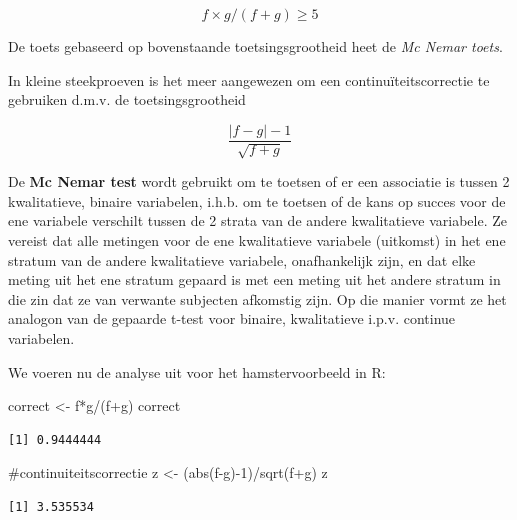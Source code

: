 \documentclass[
  dutch,
  letterpaper,
  12pt]{book}
\newenvironment{Shaded}{\begin{snugshade}}{\end{snugshade}}
\newcommand{\CommentTok}[1]{\textcolor[rgb]{0.37,0.37,0.37}{#1}}
\newcommand{\DecValTok}[1]{\textcolor[rgb]{0.68,0.00,0.00}{#1}}
\newcommand{\FunctionTok}[1]{\textcolor[rgb]{0.28,0.35,0.67}{#1}}
\newcommand{\NormalTok}[1]{\textcolor[rgb]{0.00,0.23,0.31}{#1}}
\newcommand{\OtherTok}[1]{\textcolor[rgb]{0.00,0.23,0.31}{#1}}
\newcommand{\SpecialCharTok}[1]{\textcolor[rgb]{0.37,0.37,0.37}{#1}}
\theoremstyle{definition}
\theoremstyle{definition}
\theoremstyle{definition}
\theoremstyle{remark}
\begin{document}
\[f \times g/(f+g) \geq 5\]

De toets gebaseerd op bovenstaande toetsingsgrootheid heet de \emph{Mc
Nemar toets}.

In kleine steekproeven is het meer aangewezen om een
continuïteitscorrectie te gebruiken d.m.v. de toetsingsgrootheid

\begin{equation*}
\frac{|f-g|-1}{\sqrt{f+g}}
\end{equation*}

De \textbf{Mc Nemar test} wordt gebruikt om te toetsen of er een
associatie is tussen 2 kwalitatieve, binaire variabelen, i.h.b. om te
toetsen of de kans op succes voor de ene variabele verschilt tussen de 2
strata van de andere kwalitatieve variabele. Ze vereist dat alle
metingen voor de ene kwalitatieve variabele (uitkomst) in het ene
stratum van de andere kwalitatieve variabele, onafhankelijk zijn, en dat
elke meting uit het ene stratum gepaard is met een meting uit het andere
stratum in die zin dat ze van verwante subjecten afkomstig zijn. Op die
manier vormt ze het analogon van de gepaarde t-test voor binaire,
kwalitatieve i.p.v. continue variabelen.

We voeren nu de analyse uit voor het hamstervoorbeeld in R:

\begin{Shaded}
\begin{Highlighting}[]
\NormalTok{correct }\OtherTok{\textless{}{-}}\NormalTok{ f}\SpecialCharTok{*}\NormalTok{g}\SpecialCharTok{/}\NormalTok{(f}\SpecialCharTok{+}\NormalTok{g)}
\NormalTok{correct}
\end{Highlighting}
\end{Shaded}

\begin{verbatim}
[1] 0.9444444
\end{verbatim}

\begin{Shaded}
\begin{Highlighting}[]
\CommentTok{\#continuiteitscorrectie}
\NormalTok{z }\OtherTok{\textless{}{-}}\NormalTok{ (}\FunctionTok{abs}\NormalTok{(f}\SpecialCharTok{{-}}\NormalTok{g)}\SpecialCharTok{{-}}\DecValTok{1}\NormalTok{)}\SpecialCharTok{/}\FunctionTok{sqrt}\NormalTok{(f}\SpecialCharTok{+}\NormalTok{g)}
\NormalTok{z}
\end{Highlighting}
\end{Shaded}

\begin{verbatim}
[1] 3.535534
\end{verbatim}
\end{document}
